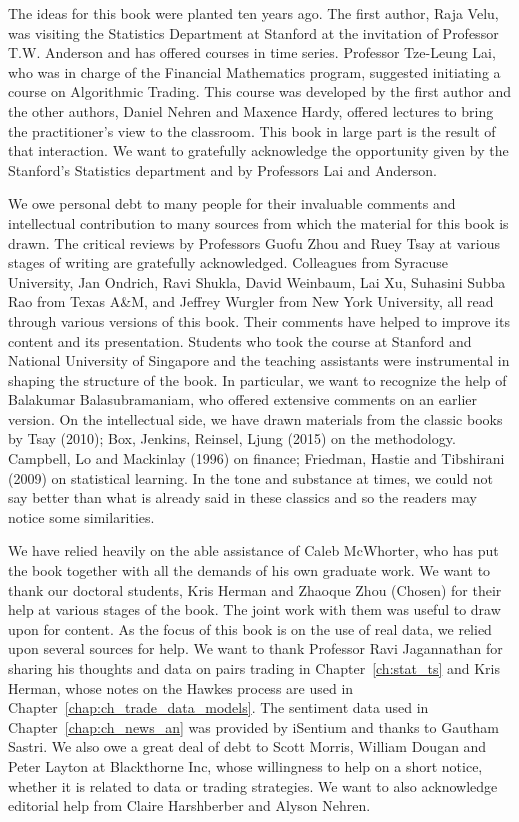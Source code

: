 The ideas for this book were planted ten years ago. The first author, Raja Velu, was visiting the Statistics Department at Stanford at the invitation of Professor T.W. Anderson and has offered courses in time series. Professor Tze-Leung Lai, who was in charge of the Financial Mathematics program, suggested initiating a course on Algorithmic Trading. This course was developed by the first author and the other authors, Daniel Nehren and Maxence Hardy, offered lectures to bring the practitioner's view to the classroom. This book in large part is the result of that interaction. We want to gratefully acknowledge the opportunity given by the Stanford's Statistics department and by Professors Lai and Anderson. 


We owe personal debt to many people for their invaluable comments and intellectual contribution to many sources from which the material for this book is drawn. The critical reviews by Professors Guofu Zhou and Ruey Tsay at various stages of writing are gratefully acknowledged. Colleagues from Syracuse University, Jan Ondrich, Ravi Shukla, David Weinbaum, Lai Xu, Suhasini Subba Rao from Texas A\&M, and Jeffrey Wurgler from New York University, all read through various versions of this book. Their comments have helped to improve its content and its presentation. Students who took the course at Stanford and National University of Singapore and the teaching assistants were instrumental in shaping the structure of the book. In particular, we want to recognize the help of Balakumar Balasubramaniam, who offered extensive comments on an earlier version. On the intellectual side, we have drawn materials from the classic books by Tsay (2010); Box, Jenkins, Reinsel, Ljung (2015) on the methodology. Campbell, Lo and Mackinlay (1996) on finance; Friedman, Hastie and Tibshirani (2009) on statistical learning. In the tone and substance at times, we could not say better than what is already said in these classics and so the readers may notice some similarities.


We have relied heavily on the able assistance of Caleb McWhorter, who has put the book together with all the demands of his own graduate work. We want to thank our doctoral students, Kris Herman and Zhaoque Zhou (Chosen) for their help at various stages of the book. The joint work with them was useful to draw upon for content. As the focus of this book is on the use of real data, we relied upon several sources for help. We want to thank Professor Ravi Jagannathan for sharing his thoughts and data on pairs trading in Chapter~\ref{ch:stat_ts} and Kris Herman, whose notes on the Hawkes process are used in Chapter~\ref{chap:ch_trade_data_models}. The sentiment data used in Chapter~\ref{chap:ch_news_an} was provided by iSentium and thanks to Gautham Sastri. We also owe a great deal of debt to Scott Morris, William Dougan and Peter Layton at Blackthorne Inc, whose willingness to help on a short notice, whether it is related to data or trading strategies. We want to also acknowledge editorial help from Claire Harshberber and Alyson Nehren. 


